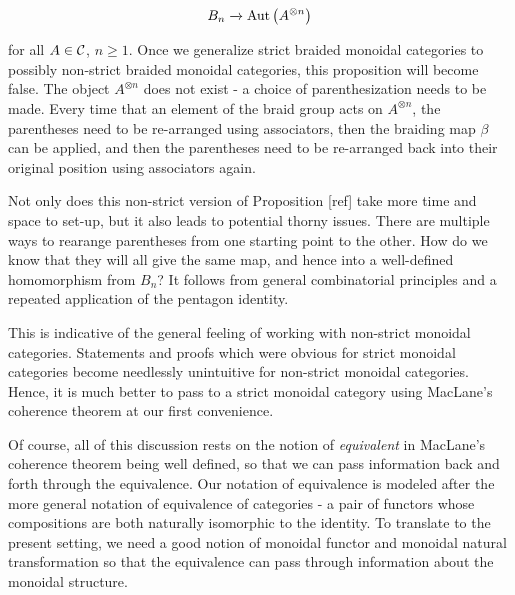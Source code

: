 $$B_n \xrightarrow{} \operatorname{Aut}\left(A^{\otimes n}\right)$$

for all $A\in {\mathcal C}$, $n\geq 1$. Once we generalize strict braided monoidal categories to possibly non-strict braided monoidal categories, this proposition will become false. The object $A^{\otimes n}$ does not exist - a choice of parenthesization needs to be made. Every time that an element of the braid group acts on $A^{\otimes n}$, the parentheses need to be re-arranged using associators, then the braiding map $\beta$ can be applied, and then the parentheses need to be re-arranged back into their original position using associators again.

Not only does this non-strict version of Proposition [ref] take more time and space to set-up, but it also leads to potential thorny issues. There are multiple ways to rearange parentheses from one starting point to the other. How do we know that they will all give the same map, and hence into a well-defined homomorphism from $B_n$? It follows from general combinatorial principles and a repeated application of the pentagon identity.

This is indicative of the general feeling of working with non-strict monoidal categories. Statements and proofs which were obvious for strict monoidal categories become needlessly unintuitive for non-strict monoidal categories. Hence, it is much better to pass to a strict monoidal category using MacLane's coherence theorem at our first convenience.

Of course, all of this discussion rests on the notion of {\em equivalent} in MacLane's coherence theorem being well defined, so that we can pass information back and forth through the equivalence. Our notation of equivalence is modeled after the more general notation of equivalence of categories - a pair of functors whose compositions are both naturally isomorphic to the identity. To translate to the present setting, we need a good notion of monoidal functor and monoidal natural transformation so that the equivalence can pass through information about the monoidal structure.

